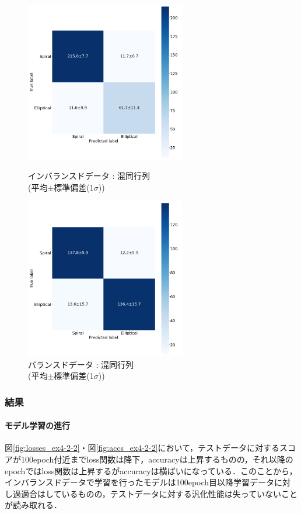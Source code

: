 \documentclass[a4j, 11pt]{jreport}
\begin{document}
\begin{figure}[H]
  \begin{minipage}[b]{0.45\hsize}
    \centering
    \includegraphics[keepaspectratio, width=7cm]{images/cm_mean_std_ex4-2.png}
    \caption{インバランスドデータ : 混同行列\\(平均$\pm$標準偏差(1$\sigma$))}
		\label{fig:cm_ex4-2-2}
  \end{minipage}
  \begin{minipage}[b]{0.45\hsize}
    \centering
    \includegraphics[keepaspectratio, width=7cm]{images/cm_mean_std_ex4-3.png}
    \caption{バランスドデータ : 混同行列\\(平均$\pm$標準偏差(1$\sigma$))}
		\label{fig:cm_ex4-3}
  \end{minipage}
\end{figure}

\subsubsection{結果}
\paragraph{モデル学習の進行}
図\ref{fig:losses_ex4-2-2}・図\ref{fig:accs_ex4-2-2}において，テストデータに対するスコアが100epoch付近までloss関数は降下，accuracyは上昇するものの，それ以降のepochではloss関数は上昇するがaccuracyは横ばいになっている．このことから，インバランスドデータで学習を行ったモデルは100epoch目以降学習データに対し過適合はしているものの，テストデータに対する汎化性能は失っていないことが読み取れる．
\end{document}
